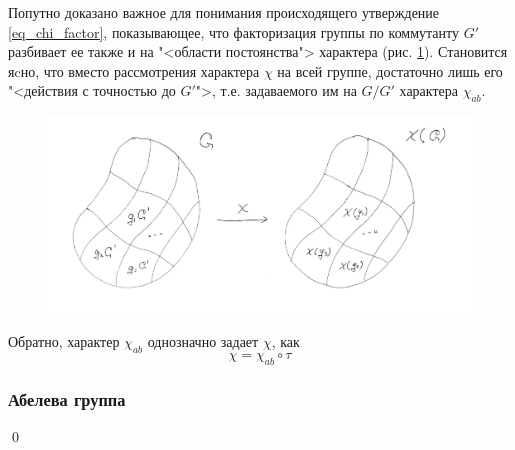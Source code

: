     \begin{remark} Попутно доказано важное для понимания происходящего 
        утверждение \eqref{eq_chi_factor}, показывающее, что факторизация 
        группы по коммутанту $G'$ разбивает ее также и на "<области постоянства"> 
        характера (рис. \ref{img_chi_factor}). Становится яcно, что вместо 
        рассмотрения характера $\chi$ на всей группе, достаточно лишь его 
        "<действия с точностью до $G'$">, т.е. задаваемого им на $G/G'$ характера 
        $\chi_{ab}$.
    \end{remark}
    
    \begin{figure}[th]
        \centering
        \includegraphics[width=\textwidth]{pictures/chips}
        \caption{}
        \label{img_chi_factor}
    \end{figure}

    \newpage
    Обратно, характер $\chi_{ab}$ однозначно задает $\chi$, как 
    \[\chi = \chi_{ab}\circ \tau\]
\subsubsection{Абелева группа}
\qed